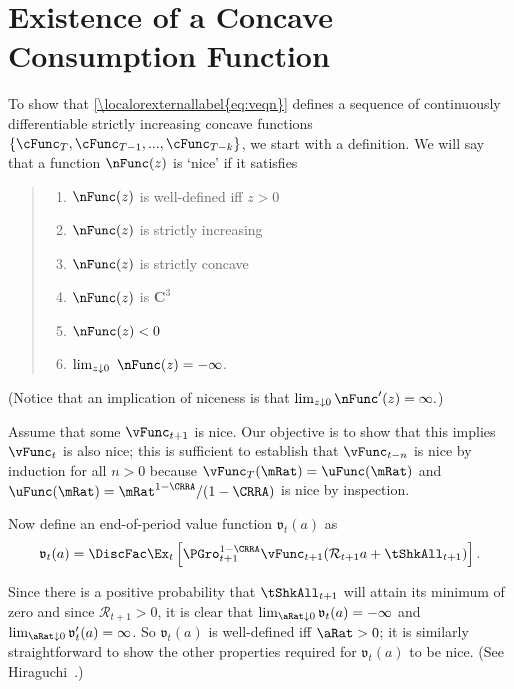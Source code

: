 \documentclass[\econtexRoot/BufferStockTheory]{subfiles}
\begin{document}
\section{Existence of a Concave Consumption Function}\label{sec:ApndxcExists}

To show that \eqref{\localorexternallabel{eq:veqn}} defines a sequence of continuously differentiable strictly increasing concave functions $\{\cFunc_{T},\cFunc_{T-1},...,\cFunc_{T-k}\}$, we start with a definition.  We will say that a function $\nFunc(z)$ is `nice' if it satisfies
\begin{quote}
\begin{enumerate}\setlength{\itemsep}{0.0ex}
\item $\nFunc(z)$ is well-defined iff $z>0$

\item $\nFunc(z)$ is strictly increasing

\item $\nFunc(z)$ is strictly concave

\item $\nFunc(z)$ is $ \mathbf{C}^{3}$

\item $\nFunc(z)<0$

\item $\lim_{z\downarrow 0}~\nFunc(z) =-\infty $.

\end{enumerate}
\end{quote}


(Notice that an implication of niceness is that $\lim_{z \downarrow 0} \nFunc^{\prime}(z) = \infty.$)

Assume that some $\vFunc_{t+1}$ is nice.  Our objective is to show that this
implies $\vFunc_{t}$ is also nice; this is sufficient to establish that
$\vFunc_{t-n}$ is nice by induction for all $n > 0$ because $\vFunc_{T}(\mRat)
=\uFunc(\mRat) $ and $\uFunc(\mRat)=\mRat^{1-\CRRA}/(1-\CRRA)$ is nice by inspection.

Now define an end-of-period value function $\mathfrak{v}_{t}(a) $ as
\begin{equation}
\mathfrak{v}_{t}(a) =\DiscFac \Ex_{t}\left[{\PGro}_{t+1}^{1-\CRRA}\vFunc_{t+1}( {\mathcal{R}}_{t+1} a+{\tShkAll}_{t+1}) \right]. \label{eq:vEnd}
\end{equation}

Since there is a positive probability that $\tShkAll_{t+1}$ will
attain its minimum of zero and since $\mathcal{R}_{t+1}>0$, it
is clear that $\lim_{\aRat \downarrow 0} \mathfrak{v}_{t}(a) = -\infty$
and $\lim_{\aRat \downarrow 0} \mathfrak{v}^{\prime}_{t}(a) = \infty$.  So
$\mathfrak{v}_{t}(a) $ is well-defined iff $\aRat>0$; it is similarly
straightforward to show the other properties required for $\mathfrak{v}_{t}(a) $ to
be nice.  (See Hiraguchi~\citeyearpar{hiraguchiBSProofs}.)
\end{document}
